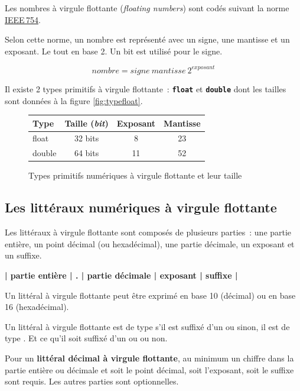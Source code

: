 Les nombres à virgule flottante (\textit{floating numbers}) sont codés suivant
la norme \href{https://fr.wikipedia.org/wiki/IEEE_754}{IEEE\,754}. 

Selon cette norme, un nombre est représenté avec un signe, une mantisse et un
exposant. Le tout en base 2. Un bit est utilisé pour le signe.  

\[
	nombre = signe~mantisse~2^{exposant} 
\]

\medskip

Il existe 2 types primitifs à virgule flottante~: \textbf{\texttt{float}} et
\textbf{\texttt{double}} dont les tailles sont données à la figure
\vref{fig:typefloat}.

\begin{figure}[h]
	\centering
	\begin{tabular}[t]{|l|c|c|c|}
		\hline
		\rowcolor{black!40}
		\textbf{Type} 	& \textbf{Taille (\textit{bit})}	
								& \textbf{Exposant} & \textbf{Mantisse}\\
		\hline
		float	& 32 bits					& 8		& 23\\
		\hline
		double	& 64 bits					& 11	& 52\\
		\hline
	\end{tabular}
	\caption{Types primitifs numériques à virgule flottante et leur taille}
	\label{fig:typefloat}
\end{figure}



\subsection{Les littéraux numériques à virgule flottante}

Les littéraux à virgule flottante sont composés de plusieurs parties~: une
partie entière, un point décimal (ou hexadécimal), une partie décimale, un
exposant et un suffixe.

\bigskip
\begin{center}
	\large\bf	| partie entière | . | partie décimale | exposant | suffixe |
\end{center}
\bigskip

Un littéral à virgule flottante peut être exprimé en base 10 (décimal) ou en 
base 16 (hexadécimal). 

Un littéral à virgule flottante est de type  s'il est suffixé d'un
 ou  sinon, il est de type . Et ce qu'il soit suffixé
d'un  ou  ou non. 

Pour un \textbf{littéral décimal à virgule flottante}, au minimum un chiffre
dans la partie entière ou décimale et soit le point décimal, soit l'exposant,
soit le suffixe sont requis. Les autres parties sont optionnelles. 

